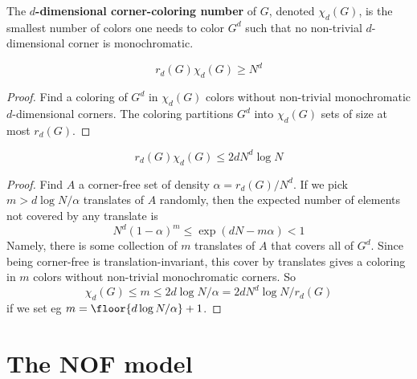 \begin{definition}
  \label{def:corner-color-num}

  The {\bf $d$-dimensional corner-coloring number} of $G$, denoted $\chi_d(G)$, is the smallest number of colors one needs to color $G^d$ such that no non-trivial $d$-dimensional corner is monochromatic.
\end{definition}

\begin{lemma}
  \label{lem:corner-num-lower}

  $$r_d(G) \chi_d(G) \ge N^d$$
\end{lemma}
\begin{proof}

  Find a coloring of $G^d$ in $\chi_d(G)$ colors without non-trivial monochromatic $d$-dimensional corners. The coloring partitions $G^d$ into $\chi_d(G)$ sets of size at most $r_d(G)$.
\end{proof}

\begin{lemma}
  \label{lem:corner-num-upper}

  $$r_d(G) \chi_d(G) \le 2d N^d \log N$$
\end{lemma}
\begin{proof}

  Find $A$ a corner-free set of density $\alpha = r_d(G)/N^d$. If we pick $m > d\log N/\alpha$ translates of $A$ randomly, then the expected number of elements not covered by any translate is
  $$N^d(1 - \alpha)^m \le \exp(dN - m\alpha) < 1$$
  Namely, there is some collection of $m$ translates of $A$ that covers all of $G^d$. Since being corner-free is translation-invariant, this cover by translates gives a coloring in $m$ colors without non-trivial monochromatic corners. So
  $$\chi_d(G) \le m \le 2d \log N/\alpha = 2d N^d \log N/r_d(G)$$
  if we set eg $m = \floor{d\log N/\alpha} + 1$.
\end{proof}


\chapter{The NOF model}

